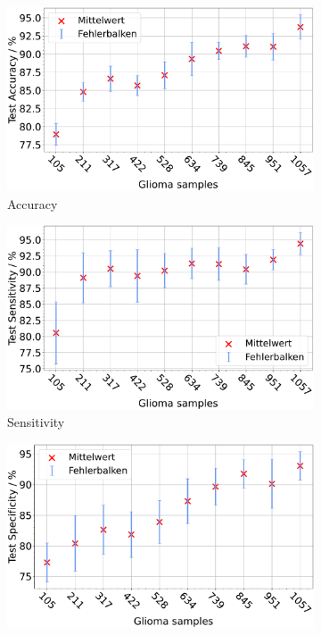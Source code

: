 \begin{figure}[H]
  \centering
  \begin{subfigure}[b]{0.48\textwidth}
    \centering
    \includegraphics[width=\textwidth]{plots/Reduzierung-Gli + Balnce_Accuracy_mean.pdf}
    \caption{Accuracy}
    \label{fig:gli-red-acc}
  \end{subfigure}
  \begin{subfigure}[b]{0.48\textwidth}
    \centering
    \includegraphics[width=\textwidth]{plots/Reduzierung-Gli + Balnce_Sensitivity_mean.pdf}
    \caption{Sensitivity}
    \label{fig:gli-red-sens}
  \end{subfigure}
  \begin{subfigure}[b]{0.48\textwidth}
    \centering
    \includegraphics[width=\textwidth]{plots/Reduzierung-Gli + Balnce_Specificity_mean.pdf}

\end{subfigure}
\end{figure}
